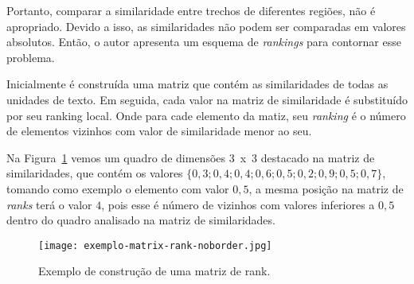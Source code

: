 Portanto, comparar a similaridade entre trechos de diferentes regiões, não é apropriado.
Devido a isso, as similaridades não podem ser comparadas em valores absolutos. Então, o autor apresenta um esquema de \textit{rankings} para contornar esse problema.


%





Inicialmente é construída uma matriz que contém as similaridades de todas as unidades de texto. Em seguida, cada valor na matriz de similaridade é substituído por seu ranking local. Onde para cade elemento da matiz, seu \textit{ranking} é o número de elementos vizinhos com valor de similaridade menor ao seu.%

Na Figura~\ref{fig:exemplomatrixrank} vemos um quadro de dimensões 3~x~3 destacado na matriz de similaridades, que contém os valores  $\{0,3; 0,4; 0,4; 0,6; 0,5; 0,2; 0,9; 0,5; 0,7\}$, tomando como exemplo o elemento com valor $0,5$, a mesma posição na matriz de \textit{ranks} terá o valor $4$, pois esse é número de vizinhos com valores inferiores a $0,5$ dentro do quadro analisado na matriz de similaridades. 








  \begin{figure}[!h]

	\centering
	\texttt{[image: exemplo-matrix-rank-noborder.jpg]}
	\caption{Exemplo de construção de uma matriz de rank.~\cite{Choi2000}}
	\label{fig:exemplomatrixrank}

  \end{figure}






